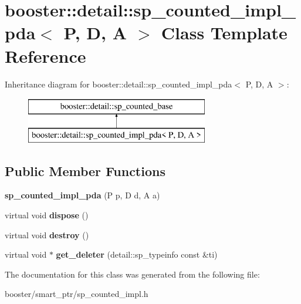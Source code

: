 \section{booster\-:\-:detail\-:\-:sp\-\_\-counted\-\_\-impl\-\_\-pda$<$ P, D, A $>$ Class Template Reference}
\label{classbooster_1_1detail_1_1sp__counted__impl__pda}
Inheritance diagram for booster\-:\-:detail\-:\-:sp\-\_\-counted\-\_\-impl\-\_\-pda$<$ P, D, A $>$\-:\begin{figure}[H]
\begin{center}
\leavevmode
\includegraphics[height=2.000000cm]{classbooster_1_1detail_1_1sp__counted__impl__pda}
\end{center}
\end{figure}
\subsection*{Public Member Functions}
\begin{DoxyCompactItemize}
\item 
{\bfseries sp\-\_\-counted\-\_\-impl\-\_\-pda} (P p, D d, A a)\label{classbooster_1_1detail_1_1sp__counted__impl__pda_a7c9dab83a3f29f6611fc274ff33b36e6}

\item 
virtual void {\bfseries dispose} ()\label{classbooster_1_1detail_1_1sp__counted__impl__pda_add9a4d9f11df14d9401b856f8ac89521}

\item 
virtual void {\bfseries destroy} ()\label{classbooster_1_1detail_1_1sp__counted__impl__pda_a756d031c3ba4c91cf5e7372c0323ab29}

\item 
virtual void $\ast$ {\bfseries get\-\_\-deleter} (detail\-::sp\-\_\-typeinfo const \&ti)\label{classbooster_1_1detail_1_1sp__counted__impl__pda_a01deec0dd9b1b2fee06e41eb110d8f73}

\end{DoxyCompactItemize}


The documentation for this class was generated from the following file\-:\begin{DoxyCompactItemize}
\item 
booster/smart\-\_\-ptr/sp\-\_\-counted\-\_\-impl.\-h\end{DoxyCompactItemize}
